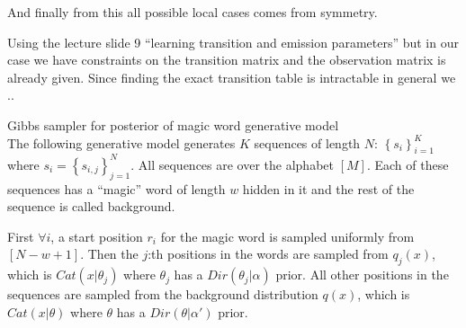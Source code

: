 \documentclass[a4paper,twoside=false,abstract=false,numbers=noenddot,
titlepage=false,headings=small,parskip=half,version=last]{scrartcl}
\begin{document}
\begin{solution}
    And finally from this all possible local cases comes from symmetry.




    Using the lecture slide 9 
    ``learning transition and emission parameters''
    but in our case we have constraints on the transition matrix and the
    observation matrix is already given.
    Since finding the exact transition table is intractable in general we ..

\end{solution}

\begin{exercise}{3}Gibbs sampler for posterior of magic word generative model\\
    The following generative model generates $K$ sequences of length $N$:
    $\left\{s_i\right\}_{i=1}^K$ where $s_i=\left\{s_{i,j}\right\}_{j=1}^N$.
    All sequences are over the alphabet $\left[M\right]$. Each of these
    sequences has a ``magic'' word of length $w$ hidden in it and the rest of
    the sequence is called background.

    First $\forall i$, a start position $r_i$ for the magic word is sampled
    uniformly from $\left[N-w+1\right]$. Then the $j$:th positions in the words
    are sampled from $q_j(x)$, which is $Cat\left(x|\theta_j\right)$ where 
    $\theta_j$ has a $Dir\left(\theta_j|\alpha\right)$ prior. All other
    positions in the sequences are sampled from the background distribution
    $q(x)$, which is $Cat\left(x|\theta\right)$ where $\theta$ has a
    $Dir\left(\theta|\alpha'\right)$ prior.
\end{exercise}
\begin{solution}
    
\end{solution}
\end{document}
